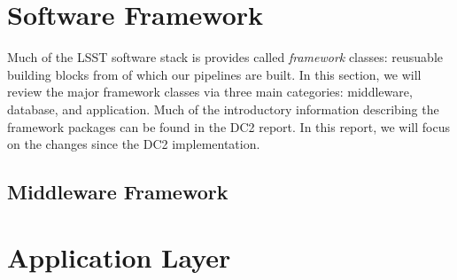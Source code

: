 \documentclass[preprint]{aastex}
\begin{document}




\section{Software Framework}

Much of the LSST software stack is provides called \textit{framework}
classes: reusuable building blocks from of which our pipelines are
built.  In this section, we will review the major framework classes
via three main categories:  middleware, database, and
application.  Much of the introductory information describing the
framework packages can be found in the DC2 report.  In this report, we
will focus on the changes since the DC2 implementation.  

\subsection{Middleware Framework}









% 



\section{Application Layer} \label{sec:applayer}


























\end{document}
